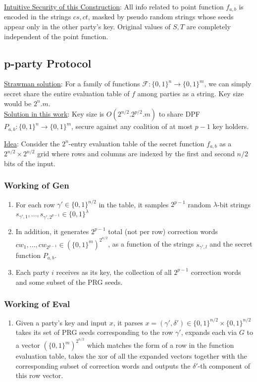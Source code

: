 \noindent \underline{Intuitive Security of this Construction}: All info related to point function $f_{a, b}$ is encoded in the strings $cs, ct$, masked by pseudo random strings whose seeds appear only in the other party's key. Original values of $S, T$ are completely independent of the point function.

\subsection{p-party Protocol}
\underline{Strawman solution}: For a family of functions $\mathcal{F}: \{0, 1\}^n \rightarrow \{0, 1\}^m$, we can simply secret share the entire evaluation table of $f$ among parties as a string. Key size would be $2^n.m$. \\

\noindent \underline{Solution in this work}: Key size is $O(2^{n/2}.2^{p/2}.m)$ to share DPF $P_{a, b}: \{0, 1\}^n \rightarrow \{0, 1\}^m$, secure against any coalition of at most $p-1$ key holders.

\noindent \underline{Idea}: Consider the $2^n$-entry evaluation table of the secret function $f_{a, b}$ as a $2^{n/2} \times 2^{n/2}$ grid where rows and columns are indexed by the first and second $n/2$ bits of the input.

\subsubsection{Working of Gen}
\begin{enumerate}
    \item For each row $\gamma' \in \{0, 1\}^{n/2}$ in the table, it samples $2^{p-1}$ random $\lambda$-bit strings $s_{\gamma', 1}, ..., s_{\gamma', 2^{p-1}} \in \{0, 1\}^\lambda$ 
    \item In addition, it generates $2^{p-1}$ total (not per row) correction words $cw_1, ..., cw_{2^{p-1}} \in (\{0, 1\}^m)^{2^{n/2}}$, as a function of the strings $s_{\gamma', l}$ and the secret function $P_{a, b}$.
    \item Each party $i$ receives as its key, the collection of all $2^{p-1}$ correction words and some subset of the PRG seeds. 
\end{enumerate}

\subsubsection{Working of Eval}
\begin{enumerate}
    \item Given a party's key and input $x$, it parses $x = (\gamma', \delta') \in \{0, 1\}^{n/2} \times \{0, 1\}^{n/2}$ takes its set of PRG seeds corresponding to the row $\gamma'$, expands each via $G$ to a vector  $(\{0, 1\}^m)^{2^{n/2}}$ which matches the form of a row in the function evaluation table, takes the xor of all the expanded vectors together with the corresponding subset of correction words and outputs the $\delta'$-th component of this row vector.
\end{enumerate}

